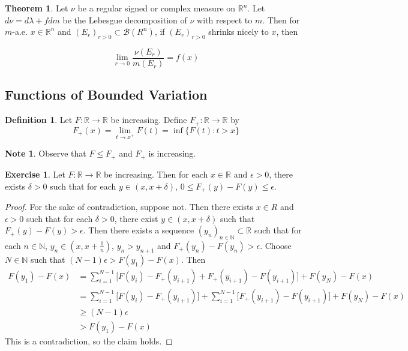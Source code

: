 \documentclass[12pt]{amsart}
\theoremstyle{definition}
\newtheorem{defn}[definition]{Definition}
\newtheorem{note}[definition]{Note}
\newtheorem{thm}[definition]{Theorem}
\newtheorem{ex}[definition]{Exercise}
\newcommand{\del}{\delta}
\newcommand{\lam}{\lambda}
\newcommand{\ep}{\epsilon}
\newcommand{\N}{\mathbb{N}}
\newcommand{\R}{\mathbb{R}}
\newcommand{\MB}{\mathcal{B}}
\begin{document}
	\begin{thm}
		Let $\nu$ be a regular signed or complex measure on $\R^n$. Let $d\nu = d\lam + f dm$ be the Lebesgue decomposition of $\nu$ with respect to $m$. Then for $m$-a.e. $x \in \R^n$ and $(E_r)_{r >0} \subset \MB(R^n)$, if $(E_r)_{r >0}$ shrinks nicely to $x$, then 
		
		$$\lim_{r \rightarrow 0} \frac{\nu(E_r)}{m(E_r)} = f(x)$$
	\end{thm}
	
	\subsection{Functions of Bounded Variation}
	
	\begin{defn}
		Let $F:\R \rightarrow \R$ be increasing. Define $F_+:\R \rightarrow \R$ by $$F_+(x) = \lim_{t \rightarrow x^+}F(t) = \inf \{F(t): t>x \}$$
	\end{defn}
	
	\begin{note}
		Observe that $F \leq F_+$ and $F_+$ is increasing.
	\end{note}
	
	\begin{ex}
		Let $F:\R \rightarrow \R$ be increasing. Then for each $x \in \R$ and $ \ep>0$, there exists $\del >0$ such that for each $y \in (x,x+\del)$, $0 \leq F_+(y) - F(y) \leq \ep$.
	\end{ex}
	
	\begin{proof}
		For the sake of contradiction, suppose not. Then there exists $x \in R$ and $\ep >0$ such that for each $\del >0$, there exist $y \in (x,x+\del)$ such that $F_+(y) - F(y) > \ep$. Then there exists a sequence $(y_n)_{n \in \N} \subset \R$ such that for each $n \in \N$, $y_n \in (x, x+\frac{1}{n})$, $y_n > y_{n+1}$ and $F_+(y_n) - F(y_n) > \ep$. Choose $N \in \N$ such that $(N-1)\ep > F(y_1) - F(x)$. Then 
		\begin{align*}
			F(y_1) - F(x) 
			&= \sum_{i=1}^{N-1} \bigg[F(y_i)-F_+(y_{i+1}) + F_+(y_{i+1}) - F(y_{i+1}) \bigg] + F(y_N)- F(x)\\
			& = \sum_{i=1}^{N-1} \bigg[F(y_i)-F_+(y_{i+1}) \bigg] + \sum_{i=1}^{N-1} \bigg[ F_+(y_{i+1}) - F(y_{i+1}) \bigg] + F(y_N)- F(x) \\
			& \geq (N-1)\ep \\
			& > F(y_1) - F(x)
		\end{align*}
		This is a contradiction, so the claim holds.
	\end{proof}
	
\end{document}
